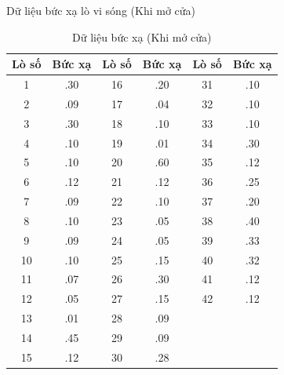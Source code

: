 \begin{frame}{Dữ liệu bức xạ lò vi sóng (Khi mở cửa)}
    \begin{table}[h]
        \centering
        \caption{Dữ liệu bức xạ (Khi mở cửa)}
        \vspace{-0.2cm}
        \footnotesize
        \renewcommand{\arraystretch}{0.85}
        \begin{tabular}{cc@{\hskip 0.8cm}cc@{\hskip 0.8cm}cc}
        \toprule
        \textbf{Lò số} & \textbf{Bức xạ} & \textbf{Lò số} & \textbf{Bức xạ} & \textbf{Lò số} & \textbf{Bức xạ} \\
        \midrule
        1  & .30 & 16 & .20 & 31 & .10 \\
        2  & .09 & 17 & .04 & 32 & .10 \\
        3  & .30 & 18 & .10 & 33 & .10 \\
        4  & .10 & 19 & .01 & 34 & .30 \\
        5  & .10 & 20 & .60 & 35 & .12 \\
        6  & .12 & 21 & .12 & 36 & .25 \\
        7  & .09 & 22 & .10 & 37 & .20 \\
        8  & .10 & 23 & .05 & 38 & .40 \\
        9  & .09 & 24 & .05 & 39 & .33 \\
        10 & .10 & 25 & .15 & 40 & .32 \\
        11 & .07 & 26 & .30 & 41 & .12 \\
        12 & .05 & 27 & .15 & 42 & .12 \\
        13 & .01 & 28 & .09 &    &     \\
        14 & .45 & 29 & .09 &    &     \\
        15 & .12 & 30 & .28 &    &     \\
        \bottomrule
        \end{tabular}
    \end{table}
    \vspace{-0.3cm}

\end{frame}

